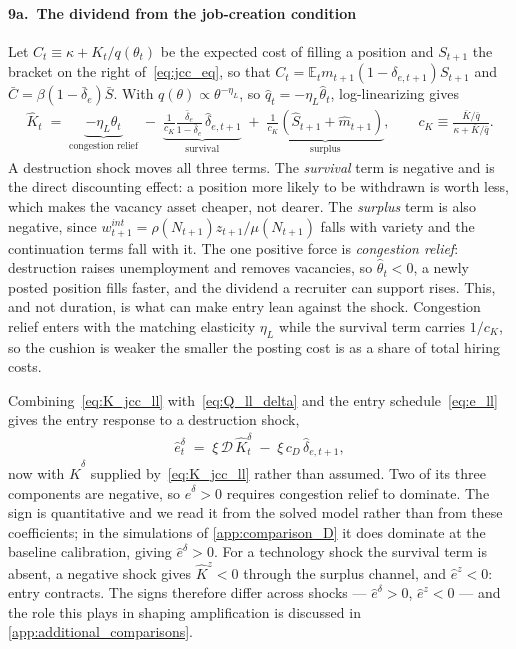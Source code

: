 \documentclass[authoryear, review, 12pt]{elsarticle}
\begin{document}
\paragraph{9a.\ The dividend from the job-creation condition}
Let $C_t\equiv\kappa+K_t/q(\theta_t)$ be the expected cost of filling a
position and $S_{t+1}$ the bracket on the right of~\eqref{eq:jcc_eq}, so that
$C_t=\mathbb{E}_t m_{t+1}(1-\delta_{e,t+1})S_{t+1}$ and
$\bar{C}=\beta(1-\bar\delta_e)\bar{S}$.  With
$q(\theta)\propto\theta^{-\eta_L}$, so $\hat{q}_t=-\eta_L\hat\theta_t$,
log-linearizing gives
\begin{align}\label{eq:K_jcc_ll}
    \hat{K}_t
    \;=\;
    \underbrace{-\eta_L\hat\theta_t}_{\displaystyle\text{congestion relief}}
    \;-\;
    \underbrace{\frac{1}{c_K}\frac{\bar\delta_e}{1-\bar\delta_e}\,
    \hat\delta_{e,t+1}}_{\displaystyle\text{survival}}
    \;+\;
    \underbrace{\frac{1}{c_K}\left(\hat{S}_{t+1}+\hat{m}_{t+1}\right)}_{\displaystyle\text{surplus}},
    \qquad
    c_K\equiv\frac{\bar{K}/\bar{q}}{\kappa+\bar{K}/\bar{q}}.
\end{align}
A destruction shock moves all three terms.  The \emph{survival} term is
negative and is the direct discounting effect: a position more likely to be
withdrawn is worth less, which makes the vacancy asset cheaper, not dearer.
The \emph{surplus} term is also negative, since
$w^{int}_{t+1}=\rho(N_{t+1})z_{t+1}/\mu(N_{t+1})$ falls with variety and the
continuation terms fall with it.  The one positive force is \emph{congestion
relief}: destruction raises unemployment and removes vacancies, so
$\hat\theta_t<0$, a newly posted position fills faster, and the dividend a
recruiter can support rises.  This, and not duration, is what can make entry
lean against the shock.  Congestion relief enters with the matching elasticity
$\eta_L$ while the survival term carries $1/c_K$, so the cushion is weaker
the smaller the posting cost is as a share of total hiring costs.

Combining~\eqref{eq:K_jcc_ll} with~\eqref{eq:Q_ll_delta} and the entry
schedule~\eqref{eq:e_ll} gives the entry response to a destruction shock,
\begin{align}\label{eq:e_ll_delta}
    \hat{e}_t^\delta
    \;=\;
    \xi\,\mathcal{D}\,\hat{K}_t^\delta
    \;-\;
    \xi\,c_D\,\hat\delta_{e,t+1},
\end{align}
now with $\hat{K}^\delta$ supplied by~\eqref{eq:K_jcc_ll} rather than assumed.
Two of its three components are negative, so $\hat{e}^\delta>0$ requires
congestion relief to dominate.  The sign is quantitative and we read it from
the solved model rather than from these coefficients; in the simulations of
\ref{app:comparison_D} it does dominate at the baseline calibration, giving
$\hat{e}^\delta>0$.  For a technology shock the survival term is absent, a
negative shock gives $\hat{K}^z<0$ through the surplus channel, and
$\hat{e}^z<0$: entry contracts.  The signs therefore differ across shocks ---
$\hat{e}^\delta>0$, $\hat{e}^z<0$ --- and the role this plays in shaping
amplification is discussed in \ref{app:additional_comparisons}.
\end{document}
